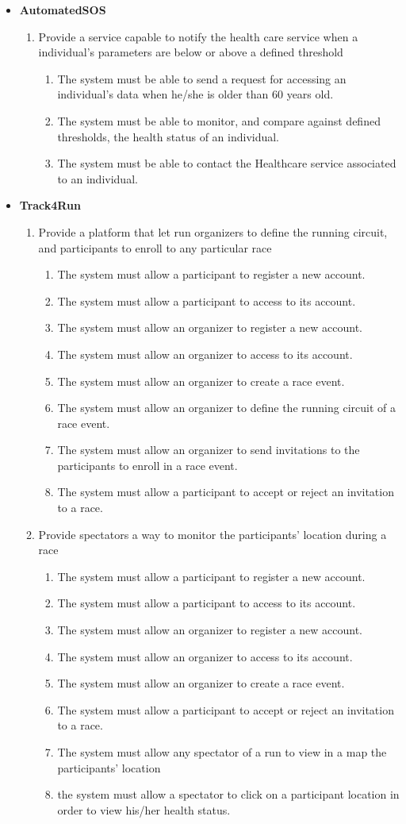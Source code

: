 \documentclass[12pt]{article}
\newcommand\requirement[1]{\item[{[R#1]}] }
\newcommand\goal[1]{\item[{[G#1]}] }
\begin{document}
\begin{itemize}
  \item{\textbf{AutomatedSOS}}
  \begin{enumerate}
    \goal{5} Provide a service capable to notify the health care service when a individual's parameters are below or above a defined threshold
    \begin{enumerate}
      \requirement{13} The system must be able to send a request for accessing an individual's data when he/she is older than 60 years old.
      \requirement{14} The system must be able to monitor, and compare against defined thresholds, the health status of an individual.
      \requirement{15} The system must be able to contact the Healthcare service associated to an individual.      
    \end{enumerate}
  \end{enumerate}
  
  \item{\textbf{Track4Run}}
  \begin{enumerate}
    \goal{6} Provide a platform that let run organizers to define the running circuit, and participants to enroll to any particular race
    \begin{enumerate}
      \requirement{16} The system must allow a participant to register a new account.
      \requirement{17} The system must allow a participant to access to its account.
      \requirement{18} The system must allow an organizer to register a new account.
      \requirement{19} The system must allow an organizer to access to its account.
      \requirement{20} The system must allow an organizer to create a race event.
      \requirement{21} The system must allow an organizer to define the running circuit of a race event.
      \requirement{22} The system must allow an organizer to send invitations to the participants to enroll in a race event.
      \requirement{23} The system must allow a participant to accept or reject an invitation to a race.
    \end{enumerate}
    
    \goal{7} Provide spectators a way to monitor the participants' location during a race
    \begin{enumerate}
      \requirement{16} The system must allow a participant to register a new account.
      \requirement{17} The system must allow a participant to access to its account.
      \requirement{18} The system must allow an organizer to register a new account.
      \requirement{19} The system must allow an organizer to access to its account.
      \requirement{20} The system must allow an organizer to create a race event.
      \requirement{23} The system must allow a participant to accept or reject an invitation to a race.
      \requirement{24} The system must allow any spectator of a run to view in a map the participants' location
      \requirement{25} the system must allow a spectator to click on a participant location in order to view his/her health status.
    \end{enumerate}
  
  \end{enumerate}
\end{itemize}
\end{document}
